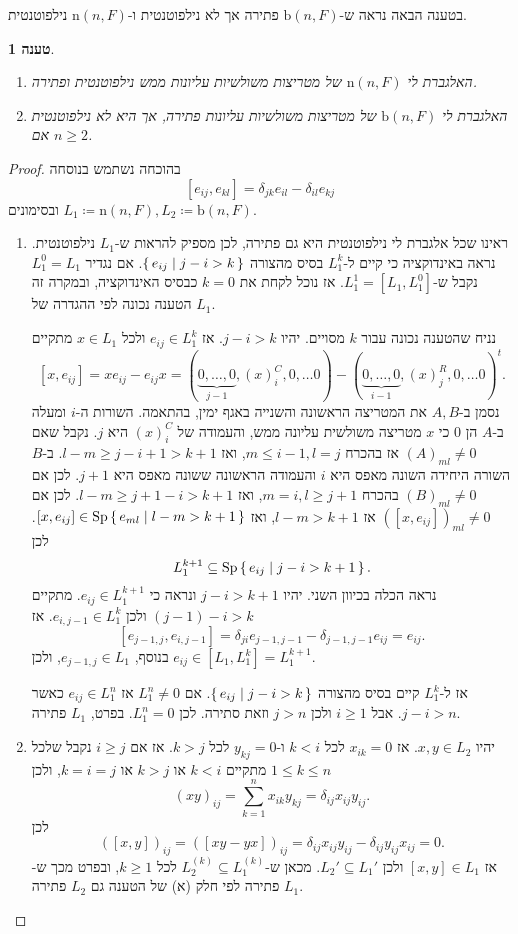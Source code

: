 \documentclass{report}
\theoremstyle{break}
\newtheorem{preposition}[preposition]{טענה}
\theoremstyle{MyNonumberbreak}
\newtheorem{proof}{הוכחה}
\DeclareMathOperator{\Sp}{Sp}
\begin{document}
בטענה הבאה נראה ש-$\mathrm{b}(n, F)$ פתירה אך לא נילפוטנטית ו-$\mathrm{n}(n, F)$ נילפוטנטית.
\begin{preposition} \label{prep:solvability-nilpotency-b(n,F)-n(n,F)}
	\begin{enumerate}[label=(\alph*)]
		\item
		האלגברת לי $\mathrm{n}(n, F)$ של מטריצות משולשיות עליונות ממש נילפוטנטית ופתירה.
		\item 
		האלגברת לי $\mathrm{b}(n, F)$ של מטריצות משולשיות עליונות פתירה, אך היא לא נילפוטנטית אם $n \ge 2$.
	\end{enumerate}
\end{preposition}
\begin{proof}
	בהוכחה נשתמש בנוסחה
	\[ [e_{ij}, e_{kl}] = \delta_{jk}e_{il} - \delta_{il}e_{kj} \]
	ובסימונים $L_1 \coloneqq \mathrm{n}(n, F), L_2 \coloneqq \mathrm{b}(n, F)$.
	\begin{enumerate}
		\item 
		ראינו שכל אלגברת לי נילפוטנטית היא גם פתירה, לכן מספיק להראות ש-$L_1$ נילפוטנטית. נראה באינדוקציה כי קיים ל-$L_1^k$ בסיס מהצורה $\set{e_{ij} | j - i > k}$. אם נגדיר $L_1^0 = L_1$ נקבל ש-$L_1^1 = [L_1, L_1^0]$. אז נוכל לקחת את $k = 0$ כבסיס האינדוקציה, ובמקרה זה הטענה נכונה לפי ההגדרה של $L_1$. 
		
		נניח שהטענה נכונה עבור $k$ מסויים. יהיו $j - i > k$. אז $e_{ij} \in L_1^k$ ולכל $x \in L_1$ מתקיים
		\[ [x, e_{ij}] = xe_{ij} - e_{ij}x = (\underbrace{0, \ldots, 0}_{j-1}, (x)^C_i, 0, \ldots 0) - (\underbrace{0, \ldots, 0}_{i-1}, (x)^R_j, 0, \ldots 0)^t. \]
נסמן ב-$A, B$ את המטריצה הראשונה והשנייה באגף ימין, בהתאמה. השורות ה-$i$ ומעלה ב-$A$ הן $0$ כי $x$ מטריצה משולשית עליונה ממש, והעמודה של $(x)^C_i$ היא $j$. נקבל שאם $(A)_{ml} \neq 0$ אז בהכרח $m \le i - 1, l = j$, ואז $l - m \ge j - i + 1 > k + 1$. ב-$B$ השורה היחידה השונה מאפס היא $i$ והעמודה הראשונה ששונה מאפס היא $j+1$. לכן אם $(B)_{ml} \neq 0$ בהכרח $m = i, l \ge j + 1$, ואז $l - m \ge j + 1 - i > k + 1$. לכן אם $([x, e_{ij}])_{ml} \neq 0$ אז $l - m > k + 1$, ואז $[x, e_{ij}] \in \Sp\set{e_{ml} | l - m > k + 1}$. לכן
\[ L_1^{k+1} \subseteq \Sp\set{e_{ij} | j - i > k + 1}. \]
נראה הכלה בכיוון השני. יהיו $j - i > k + 1$ ונראה כי $e_{ij} \in L_1^{k+1}$. מתקיים $(j-1) - i > k$ ולכן $e_{i,j-1} \in L_1^k$. אז
\[ [e_{j-1,j}, e_{i,j-1}] = \delta_{ji}e_{j-1,j-1} - \delta_{j-1,j-1}e_{ij} = e_{ij}. \]
בנוסף, $e_{j-1,j} \in L_1$, ולכן $e_{ij} \in [L_1, L_1^k] = L_1^{k+1}$.

אז ל-$L_1^k$ קיים בסיס מהצורה $\set{e_{ij} | j - i > k}$. אם $L_1^n \neq 0$ אז $e_{ij} \in L_1^n$ כאשר $j - i > n$. אבל $i \ge 1$ ולכן $j > n$ וזאת סתירה. לכן $L_1^n = 0$. בפרט, $L_1$ פתירה.		
		\item
		יהיו $x, y \in L_2$. אז $x_{ik} = 0$ לכל $k < i$ ו-$y_{kj} = 0$ לכל $k > j$. אז אם $i \ge j$ נקבל שלכל $1 \le k \le n$ מתקיים $k < i$ או $k > j$ או $k = i = j$, ולכן
		\[ (xy)_{ij} = \sum_{k=1}^n x_{ik} y_{kj} = \delta_{ij}x_{ij}y_{ij}. \]
		לכן
		\[ ([x, y])_{ij} = ([xy - yx])_{ij} = \delta_{ij}x_{ij}y_{ij} - \delta_{ij}y_{ij}x_{ij} = 0. \]
		אז $[x, y] \in L_1$ ולכן $L_2' \subseteq L_1'$. מכאן ש-$L_2^{(k)} \subseteq L_1^{(k)}$ לכל $k \ge 1$, ובפרט מכך ש-$L_1$ פתירה לפי חלק (א) של הטענה גם $L_2$ פתירה.
		

\end{enumerate}
\end{proof}
\end{document}
